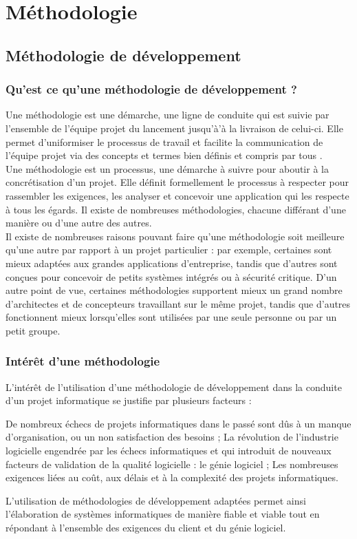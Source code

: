 \chapter{Méthodologie}
\minitoc
\clearpage
\section{Méthodologie de développement}
\subsection{Qu'est ce qu'une méthodologie de développement ?}
Une méthodologie est une démarche, une ligne de conduite qui est suivie par l’ensemble de l’équipe projet du lancement jusqu'à’à la livraison de celui-ci. Elle permet d’uniformiser le processus de travail et facilite la communication de l’équipe projet via des concepts et termes bien définis et compris par tous \cite{methode}.\\
Une méthodologie est un processus, une démarche à suivre pour aboutir à la concrétisation d'un projet. Elle définit formellement le processus à respecter pour rassembler les exigences, les analyser et concevoir une application qui les respecte à tous les égards. Il existe de nombreuses méthodologies, chacune différant d'une manière ou d'une autre des autres. \\
Il existe de nombreuses raisons pouvant faire qu'une méthodologie soit meilleure qu'une autre par rapport à un projet particulier : par exemple, certaines sont mieux adaptées aux grandes applications d'entreprise, tandis que d'autres sont conçues pour concevoir de petits systèmes intégrés ou à sécurité critique. D'un autre point de vue, certaines méthodologies supportent mieux un grand nombre d'architectes et de concepteurs travaillant sur le même projet, tandis que d'autres fonctionnent mieux lorsqu'elles sont utilisées par une seule personne ou par un petit groupe.
\subsection{Intérêt d'une méthodologie}   
L'intérêt de l'utilisation d'une méthodologie de développement dans la conduite d'un projet informatique se justifie par plusieurs facteurs :
\begin{itemize}
	\itemtirait De nombreux échecs de projets informatiques dans le passé sont dûs à un manque d'organisation, ou un non satisfaction des besoins ;
	\itemtirait La révolution de l'industrie logicielle engendrée par les échecs informatiques et qui introduit de nouveaux facteurs de validation de la qualité logicielle : le génie logiciel ;
	\itemtirait Les nombreuses exigences liées au coût, aux délais et à la complexité des projets informatiques.
\end{itemize}
L'utilisation de méthodologies de développement adaptées permet ainsi l'élaboration de systèmes informatiques de manière fiable et viable tout en répondant à l'ensemble des exigences du client et du génie logiciel.                          
